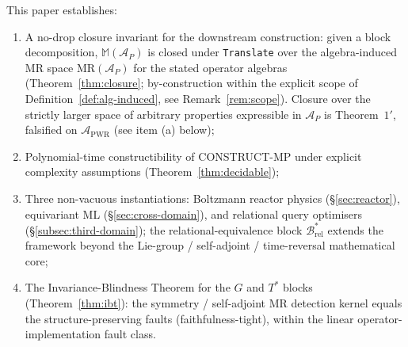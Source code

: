 \documentclass[manuscript]{acmart}
\begin{document}
\begin{tcolorbox}[breakable,colback=gray!5,colframe=black!50,arc=2pt,boxrule=0.5pt,fontupper=\small,title=Boundary of contribution,fonttitle=\small\bfseries]
This paper establishes:
\begin{enumerate}[leftmargin=*,nosep]
  \item A no-drop closure invariant for the downstream construction: given a block decomposition, $\mathbb{M}(\mathcal{A}_P)$ is closed under \texttt{Translate} over the algebra-induced MR space $\mathrm{MR}(\mathcal{A}_P)$ for the stated operator algebras (Theorem~\ref{thm:closure}; by-construction within the explicit scope of Definition~\ref{def:alg-induced}, see Remark~\ref{rem:scope}). Closure over the strictly larger space of arbitrary properties expressible in $\mathcal{A}_P$ is Theorem~$1'$, falsified on $\mathcal{A}_{\mathrm{PWR}}$ (see item (a) below);
  \item Polynomial-time constructibility of CONSTRUCT-MP under explicit complexity assumptions (Theorem~\ref{thm:decidable});
  \item Three non-vacuous instantiations: Boltzmann reactor physics (\S\ref{sec:reactor}), equivariant ML (\S\ref{sec:cross-domain}), and relational query optimisers (\S\ref{subsec:third-domain}); the relational-equivalence block $\mathcal{B}^{*}_{\mathrm{rel}}$ extends the framework beyond the Lie-group / self-adjoint / time-reversal mathematical core;
  \item The Invariance-Blindness Theorem for the $G$ and $T^{*}$ blocks (Theorem~\ref{thm:ibt}): the symmetry / self-adjoint MR detection kernel equals the structure-preserving faults (faithfulness-tight), within the linear operator-implementation fault class.
\end{enumerate}


\end{tcolorbox}
\end{document}
